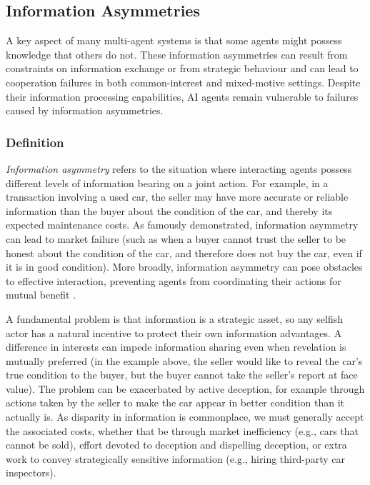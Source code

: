 \subsection{Information Asymmetries}
\label{sec:information_asymmetries}

A key aspect of many multi-agent systems is that some agents might possess knowledge that others do not. These information asymmetries can result from constraints on information exchange or from strategic behaviour and can lead to cooperation failures in both common-interest and mixed-motive settings. Despite their information processing capabilities, AI agents remain vulnerable to failures caused by information asymmetries.

\subsubsection{Definition}

\textit{Information asymmetry} refers to the situation where interacting agents possess different levels of information bearing on a joint action.
For example, in a transaction involving a used car, the seller may have more accurate or reliable information than the buyer about the condition of the car, and thereby its expected maintenance costs. 
As \citet{Akerlof70} famously demonstrated, information asymmetry can lead to market failure (such as when a buyer cannot trust the seller to be honest about the condition of the car, and therefore does not buy the car, even if it is in good condition). 
More broadly, information asymmetry can pose obstacles to effective interaction, preventing agents from coordinating their actions for mutual benefit \citep{myerson1983efficient}.

A fundamental problem is that information is a strategic asset, so any selfish actor has a natural incentive to protect their own information advantages. 
A difference in interests can impede information sharing even when revelation is mutually preferred (in the example above, the seller would like to reveal the car's true condition to the buyer, but the buyer cannot take the seller's report at face value). 
The problem can be exacerbated by active deception, for example through actions taken by the seller to make the car appear in better condition than it actually is.
As disparity in information is commonplace, we must generally accept the associated costs, whether that be through market inefficiency (e.g., cars that cannot be sold), effort devoted to deception and dispelling deception, or extra work to convey strategically sensitive information (e.g., hiring third-party car inspectors).

